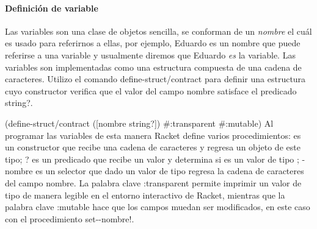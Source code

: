 \documentclass[letterpaper, twoside, openright, 11pt]{book}%
\begin{document}
\paragraph{Definición de variable} Las variables son una clase de objetos sencilla, se conforman de un \emph{nombre} el cuál es usado para referirnos a ellas, por ejemplo, {\Tt{}Eduardo\nwendquote} es un nombre que puede referirse a una variable y usualmente diremos que {\Tt{}Eduardo\nwendquote} \emph{es} la variable. Las variables son implementadas como una estructura compuesta de una cadena de caracteres. Utilizo el comando {\Tt{}define-struct/contract\nwendquote} para definir una estructura cuyo constructor verifica que el valor del campo {\Tt{}nombre\nwendquote} satisface el predicado {\Tt{}string?\nwendquote}.

\nwenddocs{}\endmoddef\nwstartdeflinemarkup{}\nwenddeflinemarkup
(define-struct/contract 
  ([nombre string?])
  #:transparent
  #:mutable)
\eatline
{}\nwendcode{}\nwdocspar
Al programar las variables de esta manera {\Tt{}Racket\nwendquote} define varios procedimientos: {\Tt{}\nwendquote} es un constructor que recibe una cadena de caracteres y regresa un objeto de este tipo; {\Tt{}?\nwendquote} es un predicado que recibe un valor y determina si es un valor de tipo {\Tt{}\nwendquote}; {\Tt{}-nombre\nwendquote} es un selector que dado un valor de tipo {\Tt{}\nwendquote} regresa la cadena de caracteres del campo {\Tt{}nombre\nwendquote}. La palabra clave {\Tt{}{\#}:transparent\nwendquote} permite imprimir un valor de tipo {\Tt{}\nwendquote} de manera legible en el entorno interactivo de {\Tt{}Racket\nwendquote}, mientras que la palabra clave {\Tt{}{\#}:mutable\nwendquote} hace que los campos muedan ser modificados, en este caso con el procedimiento {\Tt{}set--nombre!\nwendquote}.
\end{document}
